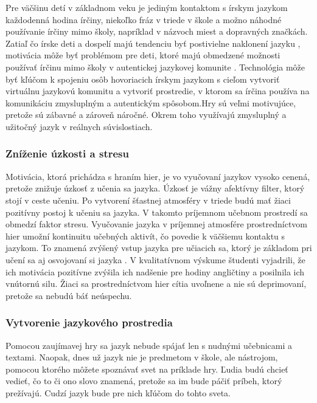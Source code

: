 \documentclass[10pt,twoside,slovak,a4paper]{article}
\begin{document}
\qquad Pre väčšinu detí v základnom veku je jediným kontaktom s írskym jazykom každodenná hodina írčiny, niekoľko fráz v triede v škole a možno náhodné používanie írčiny mimo školy, napríklad v názvoch miest a dopravných značkách. Zatiaľ čo írske deti a dospelí majú tendenciu byť postivielne naklonení jazyku \cite{BibEntry2022Nov}, motivácia môže byť problémom pre deti, ktoré majú obmedzené možnosti používať írčinu mimo školy v autentickej jazykovej komunite \cite{BibEntry2007Oct}. Technológia môže byť kľúčom k spojeniu osôb hovoriacich írskym jazykom s cieľom vytvoriť virtuálnu jazykovú komunitu a vytvoriť prostredie, v ktorom sa írčina používa na komunikáciu zmysluplným a autentickým spôsobom.Hry sú veľmi motivujúce, pretože sú zábavné a zároveň náročné. Okrem toho využívajú zmysluplný a užitočný jazyk v reálnych súvislostiach. \\
\subsubsection{Zníženie úzkosti a stresu} 
\qquad Motivácia, ktorá prichádza s hraním hier, je vo vyučovaní jazykov vysoko cenená, pretože znižuje úzkosť z učenia sa jazyka. Úzkosť je vážny afektívny filter, ktorý stojí v ceste učeniu.  Po vytvorení šťastnej atmosféry v triede budú mať žiaci pozitívny postoj k učeniu sa jazyka. V takomto príjemnom učebnom prostredí sa obmedzí faktor stresu. Vyučovanie jazyka v príjemnej atmosfére prostredníctvom hier umožní kontinuitu učebných aktivít, čo povedie k väčšiemu kontaktu s jazykom. To znamená zvýšený vstup jazyka pre učiacich sa, ktorý je základom pri učení sa aj osvojovaní si jazyka \cite{Cakir2004Sep}.  V kvalitatívnom výskume \cite{Koksal2022Nov} študenti vyjadrili, že ich motivácia pozitívne zvýšila ich nadšenie pre hodiny angličtiny a posilnila ich vnútornú silu. Žiaci sa prostredníctvom hier cítia uvoľnene a nie sú deprimovaní, pretože sa nebudú báť neúspechu. \cite{Akkaya2016Oct}\\

\subsubsection{Vytvorenie jazykového prostredia} 
\qquad Pomocou zaujímavej hry sa jazyk nebude spájať len s nudnými učebnicami a textami. Naopak, dnes už jazyk nie je predmetom v škole, ale nástrojom, pomocou ktorého môžete spoznávať svet na príklade hry. Ľudia budú chcieť vedieť, čo to či ono slovo znamená, pretože sa im bude páčiť príbeh, ktorý prežívajú. Cudzí jazyk bude pre nich kľúčom do tohto sveta.\\
\end{document}
